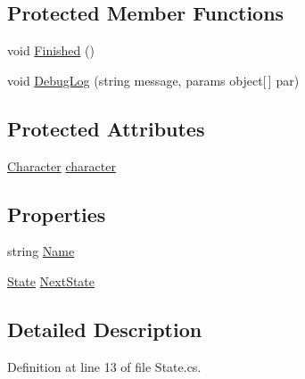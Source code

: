 \subsection*{Protected Member Functions}
\begin{DoxyCompactItemize}
\item 
void \hyperlink{class_project_porcupine_1_1_entities_1_1_states_1_1_state_a2a2356d04d252973b4631b11531e6218}{Finished} ()
\item 
void \hyperlink{class_project_porcupine_1_1_entities_1_1_states_1_1_state_a47d4b5ed4e9de5c42eefdf39830fd665}{Debug\+Log} (string message, params object\mbox{[}$\,$\mbox{]} par)
\end{DoxyCompactItemize}
\subsection*{Protected Attributes}
\begin{DoxyCompactItemize}
\item 
\hyperlink{class_project_porcupine_1_1_entities_1_1_character}{Character} \hyperlink{class_project_porcupine_1_1_entities_1_1_states_1_1_state_a0647dd5dacc8fba22b1c462c954180c7}{character}
\end{DoxyCompactItemize}
\subsection*{Properties}
\begin{DoxyCompactItemize}
\item 
string \hyperlink{class_project_porcupine_1_1_entities_1_1_states_1_1_state_a6f88eac7c687ff082d5eff3d8a3b5b36}{Name}
\item 
\hyperlink{class_project_porcupine_1_1_entities_1_1_states_1_1_state}{State} \hyperlink{class_project_porcupine_1_1_entities_1_1_states_1_1_state_ac86f35a38df13f9c426ea32265b8455a}{Next\+State}
\end{DoxyCompactItemize}


\subsection{Detailed Description}


Definition at line 13 of file State.\+cs.



